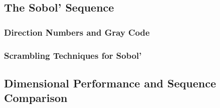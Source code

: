  \subsection{The Sobol' Sequence}



    \subsubsection{Direction Numbers and Gray Code}



    \subsubsection{Scrambling Techniques for Sobol'}



  \subsection{Dimensional Performance and Sequence Comparison}
